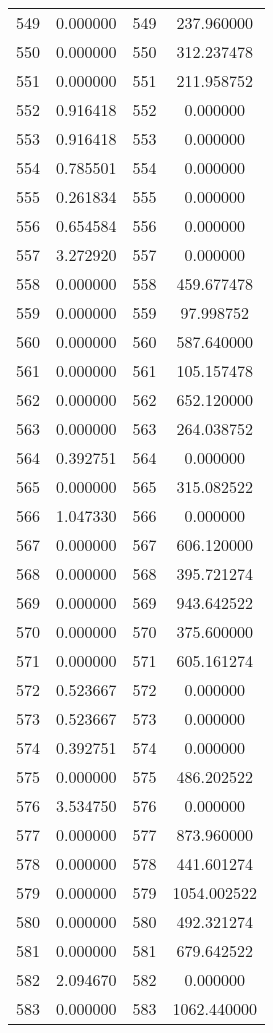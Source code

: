 \documentclass[12pt]{article}
\begin{document}
\begin{longtable}{@{}cccc@{}}
549 & 0.000000 & 549 & 237.960000 \\
550 & 0.000000 & 550 & 312.237478 \\
551 & 0.000000 & 551 & 211.958752 \\
552 & 0.916418 & 552 & 0.000000 \\
553 & 0.916418 & 553 & 0.000000 \\
554 & 0.785501 & 554 & 0.000000 \\
555 & 0.261834 & 555 & 0.000000 \\
556 & 0.654584 & 556 & 0.000000 \\
557 & 3.272920 & 557 & 0.000000 \\
558 & 0.000000 & 558 & 459.677478 \\
559 & 0.000000 & 559 & 97.998752 \\
560 & 0.000000 & 560 & 587.640000 \\
561 & 0.000000 & 561 & 105.157478 \\
562 & 0.000000 & 562 & 652.120000 \\
563 & 0.000000 & 563 & 264.038752 \\
564 & 0.392751 & 564 & 0.000000 \\
565 & 0.000000 & 565 & 315.082522 \\
566 & 1.047330 & 566 & 0.000000 \\
567 & 0.000000 & 567 & 606.120000 \\
568 & 0.000000 & 568 & 395.721274 \\
569 & 0.000000 & 569 & 943.642522 \\
570 & 0.000000 & 570 & 375.600000 \\
571 & 0.000000 & 571 & 605.161274 \\
572 & 0.523667 & 572 & 0.000000 \\
573 & 0.523667 & 573 & 0.000000 \\
574 & 0.392751 & 574 & 0.000000 \\
575 & 0.000000 & 575 & 486.202522 \\
576 & 3.534750 & 576 & 0.000000 \\
577 & 0.000000 & 577 & 873.960000 \\
578 & 0.000000 & 578 & 441.601274 \\
579 & 0.000000 & 579 & 1054.002522 \\
580 & 0.000000 & 580 & 492.321274 \\
581 & 0.000000 & 581 & 679.642522 \\
582 & 2.094670 & 582 & 0.000000 \\
583 & 0.000000 & 583 & 1062.440000 \\

\end{longtable}
\end{document}
